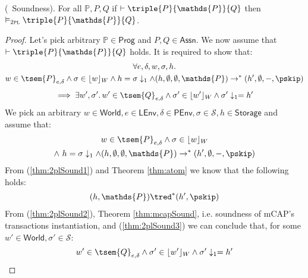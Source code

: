 \begin{thm}
	\label{thm:2plSound}
	(\tpl\ Soundness).
	For all $\mathds{P}, P, Q$ if $\vdash \triple{P}{\mathds{P}}{Q}$ then $\vDash_\textsc{2pl} \triple{P}{\mathds{P}}{Q}$.
	\begin{proof}
		Let's pick arbitrary $\mathds{P} \in \mathsf{Prog}$ and $P, Q \in \mathsf{Assn}$. We now assume that $\vdash \triple{P}{\mathds{P}}{Q}$ holds. It is required to show that:
		\begin{gather}
			\forall e, \delta, w, \sigma, h \ldotp \\
			w \in \tsem{P}_{e, \delta} \land \sigma \in \lfloor w \rfloor_W \land h = \sigma \downarrow_1 \land (h, \emptyset, \emptyset, \mathds{P}) \rightarrow^* (h', \emptyset, -, \pskip) \\[0.4em]
			\implies \exists w', \sigma' \ldotp w' \in \tsem{Q}_{e, \delta} \land \sigma' \in \lfloor w' \rfloor_W \land \sigma' \downarrow_1 = h'
		\end{gather}
		We pick an arbitrary $w \in \mathsf{World}, e \in \mathsf{LEnv}, \delta \in \mathsf{PEnv}, \sigma \in \mathcal{S}, h \in \mathsf{Storage}$ and assume that:
		\begin{gather}
			\label{thm:2plSound2} w \in \tsem{P}_{e, \delta} \land \sigma \in \lfloor w \rfloor_W \\
			\label{thm:2plSound1} \land\ h = \sigma \downarrow_1 \land (h, \emptyset, \emptyset, \mathds{P}) \rightarrow^* (h', \emptyset, -, \pskip)
		\end{gather}
		From (\ref{thm:2plSound1}) and Theorem \ref{thm:atom} we know that the following holds:
		\begin{gather}
			\label{thm:2plSound3}
			(h, \mathds{P}) \tred^* (h', \pskip)
		\end{gather}
		From (\ref{thm:2plSound2}), Theorem \ref{thm:mcapSound}, i.e. soundness of mCAP's transactions instantiation, and (\ref{thm:2plSound3}) we can conclude that, for some $w' \in \mathsf{World}, \sigma' \in \mathcal{S}$:
		\[
			w' \in \tsem{Q}_{e, \delta} \land \sigma' \in \lfloor w' \rfloor_W \land \sigma' \downarrow_1 = h'
		\]
	\end{proof}
\end{thm}